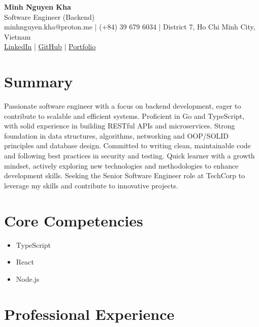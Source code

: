 \documentclass[11pt,a4paper]{article}
\begin{document}
\begin{center}
  {\huge \textbf{ Minh Nguyen Kha }}\\[0.3cm]
  {\large Software Engineer (Backend) }\\[0.2cm]
  minhnguyen.kha@proton.me | (+84) 39 679 6034 | District 7, Ho Chi Minh City, Vietnam\\
  \href{ https://linkedin.com/in/minh-nguyen-kha }{LinkedIn}
   | \href{ https://github.com/MinhNguyenKha02 }{GitHub}
   | \href{ https://your-portfolio.com }{Portfolio}
\end{center}

\vspace{0.3cm}

\section*{Summary}
Passionate software engineer with a focus on backend development, eager to contribute to scalable and efficient systems. Proficient in Go and TypeScript, with solid experience in building RESTful APIs and microservices. Strong foundation in data structures, algorithms, networking and OOP/SOLID principles and database design. Committed to writing clean, maintainable code and following best practices in security and testing. Quick learner with a growth mindset, actively exploring new technologies and methodologies to enhance development skills. Seeking the Senior Software Engineer role at TechCorp to leverage my skills and contribute to innovative projects.

\vspace{0.2cm}

\section*{Core Competencies}
\begin{itemize}[leftmargin=*,noitemsep,itemsep=0pt,label=$\bullet$,labelsep=0.5em]
  \item TypeScript
  \item React
  \item Node.js
\end{itemize}

\vspace{0.2cm}

\section*{Professional Experience}
\end{document}

